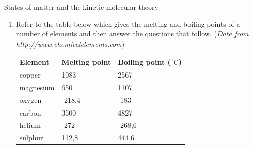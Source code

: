 \begin{eocexercises}{States of matter and the kinetic molecular theory}
\begin{enumerate}[noitemsep, label=\textbf{\arabic*}. ]
            \label{m38730*uid108}\item Refer to the table below which gives the melting and 
boiling points of a number of elements and then answer the questions that 
follow. (\textsl{Data from 
http://www.chemicalelements.com})
          \begin{table}[H]
        \begin{center}
      \label{m38730*id311817}
    \noindent
      \tablelasttail{}
      \begin{xtabular}[t]{|l|l|l|}\hline
        \textbf{Element} &
        \textbf{Melting 
point} &
        \textbf{Boiling point (${}^{\ensuremath{{\,}^{\circ}}}\mathrm{C}$)}
     \tabularnewline{}
        copper &
        1083 &
        2567%
     \tabularnewline{}
        magnesium &
        650 &
        1107%
     \tabularnewline{}
        oxygen &
        -218,4 &
        -183%
     \tabularnewline{}
        carbon &
        3500 &
        4827%
     \tabularnewline{}
        helium &
        -272 &
        -268,6%
     \tabularnewline{}
        sulphur &
        112,8 &
        444,6%
     \tabularnewline{}
    \end{xtabular}
      \end{center}
\end{table}

\end{enumerate}
\end{eocexercises}
